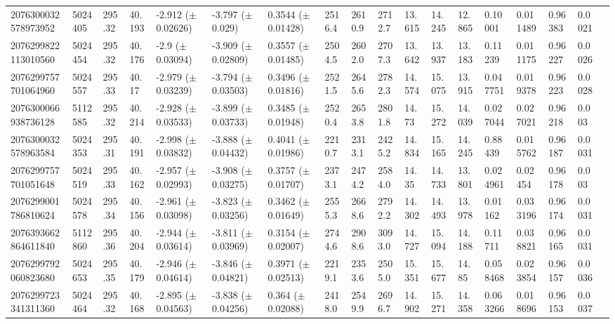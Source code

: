 \begin{sidewaystable}[htbp]
{\begin{tabular}{llllllllllllllllll}
            2076300032578973952 & 5024405 & 295.32 & 40.193 & -2.912 ($\pm$ 0.02626) & -3.797 ($\pm$ 0.029) & 0.3544 ($\pm$ 0.01428) & 2516.4 & 2610.9 & 2712.7 & 13.615 & 14.245 & 12.865 & 0.10001 & 0.011489 & 0.96383 & 0.0021 & \\
            2076299822113010560 & 5024454 & 295.32 & 40.176 & -2.9 ($\pm$ 0.03094) & -3.909 ($\pm$ 0.02809) & 0.3557 ($\pm$ 0.01485) & 2504.5 & 2602.0 & 2707.3 & 13.642 & 13.937 & 13.183 & 0.11239 & 0.011175 & 0.96227 & 0.0026 & \\
            2076299757701064960 & 5024557 & 295.33 & 40.17 & -2.979 ($\pm$ 0.03239) & -3.794 ($\pm$ 0.03503) & 0.3496 ($\pm$ 0.01816) & 2521.5 & 2645.6 & 2782.3 & 14.574 & 15.075 & 13.915 & 0.047751 & 0.019378 & 0.96223 & 0.0028 & \\
            2076300066938736128 & 5112585 & 295.32 & 40.214 & -2.928 ($\pm$ 0.03533) & -3.899 ($\pm$ 0.03733) & 0.3485 ($\pm$ 0.01948) & 2520.4 & 2653.8 & 2801.8 & 14.73 & 15.272 & 14.039 & 0.027044 & 0.027021 & 0.96218 & 0.003 & \\
            2076300032578963584 & 5024353 & 295.31 & 40.191 & -2.998 ($\pm$ 0.03832) & -3.888 ($\pm$ 0.04432) & 0.4041 ($\pm$ 0.01986) & 2210.7 & 2313.1 & 2425.2 & 14.834 & 15.165 & 14.245 & 0.88439 & 0.015762 & 0.96187 & 0.0031 & \\
            2076299757701051648 & 5024519 & 295.33 & 40.162 & -2.957 ($\pm$ 0.02993) & -3.908 ($\pm$ 0.03275) & 0.3757 ($\pm$ 0.01707) & 2373.1 & 2474.2 & 2584.0 & 14.35 & 14.733 & 13.801 & 0.024961 & 0.02454 & 0.96178 & 0.003 & \\
            2076299001786810624 & 5024578 & 295.34 & 40.156 & -2.961 ($\pm$ 0.03098) & -3.823 ($\pm$ 0.03256) & 0.3462 ($\pm$ 0.01649) & 2555.3 & 2668.6 & 2792.2 & 14.302 & 14.493 & 13.978 & 0.01162 & 0.033196 & 0.96174 & 0.0031 & \\
            2076393662864611840 & 5112860 & 295.36 & 40.204 & -2.944 ($\pm$ 0.03614) & -3.811 ($\pm$ 0.03969) & 0.3154 ($\pm$ 0.02007) & 2744.6 & 2908.6 & 3093.0 & 14.727 & 15.094 & 14.188 & 0.11711 & 0.038821 & 0.96165 & 0.0031 & \\
            2076299792060823680 & 5024653 & 295.35 & 40.179 & -2.946 ($\pm$ 0.04614) & -3.846 ($\pm$ 0.04821) & 0.3971 ($\pm$ 0.02513) & 2219.1 & 2353.6 & 2505.0 & 15.351 & 15.677 & 14.85 & 0.058468 & 0.023854 & 0.96157 & 0.0036 & \\
            2076299723341311360 & 5024464 & 295.32 & 40.168 & -2.895 ($\pm$ 0.04563) & -3.838 ($\pm$ 0.04256) & 0.364 ($\pm$ 0.02088) & 2418.0 & 2549.9 & 2696.7 & 14.902 & 15.271 & 14.358 & 0.063266 & 0.018696 & 0.96153 & 0.0037 & \\

\end{tabular}}
\end{sidewaystable}
